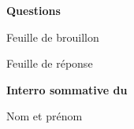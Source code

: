 \documentclass[12pt,french,a4paper,oneside]{article}
\newcommand{\thesubtitle}{Interro sommative du \thedate{}}
\begin{document}
\begin{examcopy}[2]
	\vfill{}

	\begin{center}
	\end{center}

	\clearpage{}


	\textbf{\Large{}Questions}

	\vspace{1em}




	\clearpage{}

	\begin{center}
		{\large{Feuille de brouillon}}
	\end{center}

	\clearpage{}

	\AMCformBegin{}

	\begin{center}\Large Feuille de réponse\end{center}

	{\bf \thetitle{}\hspace*{\fill}\thesubtitle{}}

	\vspace{1em}

	Nom et prénom \\
	\namefield{\fbox{\begin{minipage}{\linewidth}%
				\vspace{1cm}\namefielddots{}%
				\vspace*{1mm}%
			\end{minipage}}}

	\vspace{1em}


	\AMCform{}
	\clearpage{}

\end{examcopy}
\end{document}
